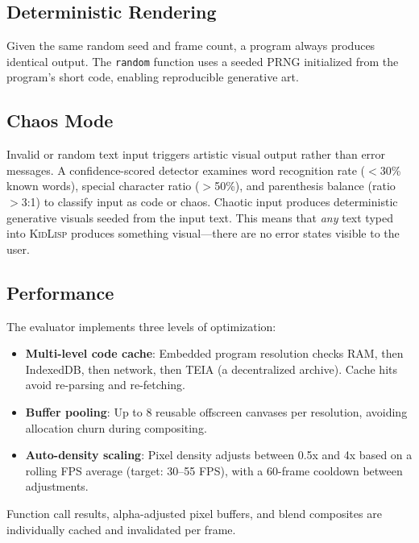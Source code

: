 \documentclass[10pt,letterpaper,twocolumn]{article}
\newcommand{\kidlisp}{\textsc{KidLisp}}
\begin{document}
\subsection{Deterministic Rendering}

Given the same random seed and frame count, a program always produces identical output. The \texttt{random} function uses a seeded PRNG initialized from the program's short code, enabling reproducible generative art.

\subsection{Chaos Mode}

Invalid or random text input triggers artistic visual output rather than error messages. A confidence-scored detector examines word recognition rate ($<$30\% known words), special character ratio ($>$50\%), and parenthesis balance (ratio $>$3:1) to classify input as code or chaos. Chaotic input produces deterministic generative visuals seeded from the input text. This means that \emph{any} text typed into \kidlisp{} produces something visual---there are no error states visible to the user.

\subsection{Performance}

The evaluator implements three levels of optimization:

\begin{itemize}
  \item \textbf{Multi-level code cache}: Embedded program resolution checks RAM, then IndexedDB, then network, then TEIA (a decentralized archive). Cache hits avoid re-parsing and re-fetching.
  \item \textbf{Buffer pooling}: Up to 8 reusable offscreen canvases per resolution, avoiding allocation churn during compositing.
  \item \textbf{Auto-density scaling}: Pixel density adjusts between 0.5x and 4x based on a rolling FPS average (target: 30--55 FPS), with a 60-frame cooldown between adjustments.
\end{itemize}

Function call results, alpha-adjusted pixel buffers, and blend composites are individually cached and invalidated per frame.

\end{document}
